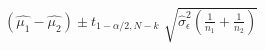 \documentclass[12pt]{article}
\begin{document}
\pagestyle{empty}
\Large
{}
\pagecolor{ehandbook}

\boldmath

\begin{eqnarray*}
(\hat{\mu_1} - \hat{\mu_2}) \pm t_{1-\alpha/2, N-k} \,\,\sqrt{\hat{\sigma}^2_\epsilon \left(
\frac{1}{n_1}+\frac{1}{n_2}\right)}
\end{eqnarray*}
\end{document}
